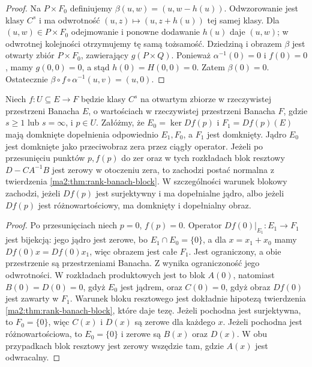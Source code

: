 \begin{proof}
Na $P\times F_0$ definiujemy
$\beta(u,w)=(u,w-h(u))$. Odwzorowanie jest klasy
$C^s$ i ma odwrotność $(u,z)\mapsto(u,z+h(u))$
tej samej klasy. Dla $(u,w)\in P\times F_0$ odejmowanie i ponowne
dodawanie $h(u)$ daje $(u,w)$; w odwrotnej kolejności
otrzymujemy tę samą tożsamość. Dziedziną i obrazem
$\beta$ jest otwarty zbiór $P\times F_0$, zawierający
$g(P\times Q)$. Ponieważ $\alpha^{-1}(0)=0$ i $f(0)=0$,
mamy $g(0,0)=0$, a stąd $h(0)=H(0,0)=0$.
Zatem $\beta(0)=0$. Ostatecznie
$\beta\circ f\circ\alpha^{-1}(u,v)=(u,0)$.
\end{proof}

\begin{wniosek}
\label{ma2:cor:rank-split}
Niech $f:U\subseteq E\to F$ będzie klasy $C^s$
na otwartym zbiorze w rzeczywistej przestrzeni Banacha
$E$, o wartościach w rzeczywistej przestrzeni Banacha
$F$, gdzie $s\ge1$ lub $s=\infty$, i $p\in U$.
Załóżmy, że $E_0=\ker Df(p)$ i $F_1=Df(p)(E)$
mają domknięte dopełnienia odpowiednio $E_1,F_0$,
a $F_1$ jest domknięty. Jądro $E_0$ jest domknięte
jako przeciwobraz zera przez ciągły operator.
Jeżeli po przesunięciu
punktów $p,f(p)$ do zer oraz w tych rozkładach
blok resztowy $D-CA^{-1}B$ jest zerowy w otoczeniu
zera, to zachodzi postać normalna z twierdzenia
\ref{ma2:thm:rank-banach-block}.
W szczególności warunek blokowy zachodzi, jeżeli
$Df(p)$ jest surjektywny i ma dopełnialne jądro,
albo jeżeli $Df(p)$ jest różnowartościowy, ma domknięty
i dopełnialny obraz.
\end{wniosek}
\begin{proof}
Po przesunięciach niech $p=0$, $f(p)=0$.
Operator $Df(0)|_{E_1}:E_1\to F_1$ jest bijekcją:
jego jądro jest zerowe, bo $E_1\cap E_0=\{0\}$,
a dla $x=x_1+x_0$ mamy $Df(0)x=Df(0)x_1$,
więc obrazem jest całe $F_1$. Jest ograniczony,
a obie przestrzenie są przestrzeniami Banacha.
Z
wynika ograniczoność jego odwrotności. W rozkładach
produktowych jest to blok $A(0)$, natomiast
$B(0)=D(0)=0$, gdyż $E_0$ jest jądrem,
oraz $C(0)=0$, gdyż obraz $Df(0)$ jest zawarty w $F_1$.
Warunek bloku resztowego jest dokładnie hipotezą
twierdzenia \ref{ma2:thm:rank-banach-block}, które
daje tezę. Jeżeli pochodna jest surjektywna, to
$F_0=\{0\}$, więc $C(x)$ i $D(x)$ są zerowe
dla każdego $x$. Jeżeli pochodna jest różnowartościowa,
to $E_0=\{0\}$ i zerowe są $B(x)$ oraz $D(x)$.
W obu przypadkach blok resztowy jest zerowy wszędzie
tam, gdzie $A(x)$ jest odwracalny.
\end{proof}

